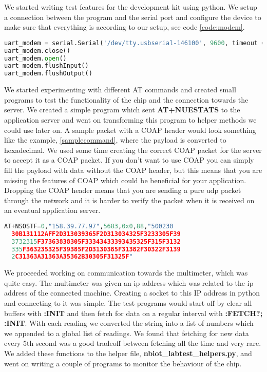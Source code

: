 \documentclass[USenglish]{ifimaster}  %
\begin{document}
We started writing test features for the development kit using python. We setup a connection between the program and the serial port and configure the device to make sure that everything is according to our setup, see code \vref{code:modem}.

\begin{lstlisting}[caption={Development kit initiation},label={code:modem},language=Python]
uart_modem = serial.Serial('/dev/tty.usbserial-146100', 9600, timeout = 0)
uart_modem.close()
uart_modem.open()
uart_modem.flushInput()
uart_modem.flushOutput()
\end{lstlisting}

We started experimenting with different AT commands and created small programs to test the functionality of the chip and the connection towards the server. We created a simple program which sent \textbf{AT+NUESTATS} to the application server and went on transforming this program to helper methods we could use later on. A sample packet with a COAP header would look something like the example, \vref{samplecommand}, where the payload is converted to hexadecimal. We used some time creating the correct COAP packet for the server to accept it as a COAP packet. If you don't want to use COAP you can simply fill the payload with data without the COAP header, but this means that you are missing the features of COAP which could be beneficial for your application. Dropping the COAP header means that you are sending a pure \acrshort{udp} packet through the network and it is harder to verify the packet when it is received on an eventual application server.

\begin{lstlisting}[caption={Sample transmit 158.39.77.97:5683, 88 bytes},label={samplecommand},language=Python]
  AT+NSOSTF=0,"158.39.77.97",5683,0x0,88,"500230
  30B131112AFF2D313039365F2D313034325F3233305F39
  3732315F37363838305F33343433393435325F315F3132
  335F363235325F39385F2D3130385F31382F30322F3139
  2C31363A31363A35362B30305F31325F"
\end{lstlisting}

We proceeded working on communication towards the multimeter, which was quite easy. The multimeter was given an \acrshort{ip} address which was related to the \acrshort{ip} address of the connected machine. Creating a socket to this IP address in python and connecting to it was simple. The test programs would start off by clear all buffers with \textbf{:INIT} and then fetch for data on a regular interval with \textbf{:FETCH?; :INIT}. With each reading we converted the string into a list of numbers which we appended to a global list of readings. We found that fetching for new data every 5th second was a good tradeoff between fetching all the time and very rare. We added these functions to the helper file, \textbf{nbiot\_labtest\_helpers.py}, and went on writing a couple of programs to monitor the behaviour of the chip.
\end{document}
